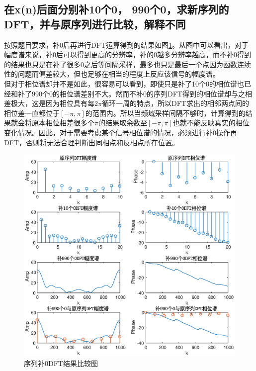 \documentclass[UTF8]{article}
\begin{document}
\begin{CJK}{UTF8}{gkai}
\subsection{在x(n)后面分别补10个0， 990个0，求新序列的DFT，并与原序列进行比较，解释不同}
按照题目要求，补0后再进行DFT运算得到的结果如图\ref{pro1_fig4}。从图中可以看出，对于幅度谱来说，补0后可以得到更高的分辨率，补的0越多分辨率越高，而不补0得到的结果也只是在补了很多0之后等间隔采样，最多也只是最后一个点因为函数连续性的问题而偏差较大，但也足够在相当的程度上反应该信号的幅度谱。\\
但对于相位谱却并不是如此，很容易可以看到，即使只是补了10个0的相位谱也已经和补了990个0的相位谱差别不大。然而不补0的序列DFT得到的相位谱却与之相差极大，这是因为相位具有每$2\pi$循环一周的特点，所以DFT求出的相邻两点间的相位差一直都位于$[-\pi,\pi]$的范围内。所以当频域采样间隔不够时，计算得到的结果就会将原本相位相差很多个$\pi$的结果取余数至$[-\pi,\pi]$也就不能反映真实的相位变化情况。因此，对于需要考虑某个信号相位谱的情况，必须进行补0操作再DFT，否则将无法合理判断出同相点和反相点所在位置。
\begin{figure}
  \centering
  \includegraphics[scale=0.7]{pro1_subpro3.eps}
  \caption{序列补0DFT结果比较图}
  \label{pro1_fig4}
\end{figure}

\end{CJK}
\end{document}

